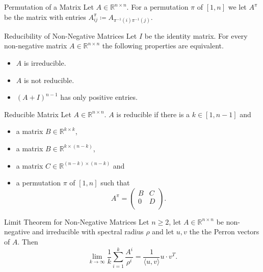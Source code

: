 \documentclass[english]{panikzettel}
\begin{document}
\begin{halfboxl}
\vspace{-\baselineskip}
	\begin{defi}{Permutation of a Matrix}
	Let $A\in\mathbb{R}^{n\times n}$. For a permutation $\pi$ of $[1,n]$ we let $A^\pi$ be the matrix with entries $A_{ij}^\pi\coloneqq A_{\pi^{-1}(i)\pi^{-1}(j)}$.
	\end{defi}

	\begin{theo}{Reducibility of Non-Negative Matrices}
	Let $I$ be the identity matrix. For every non-negative matrix $A\in\mathbb{R}^{n\times n}$ the following properties are equivalent.
	\begin{itemize}
	\item $A$ is irreducible.
	\item $A$ is not reducible.
	\item $(A+I)^{n-1}$ has only positive entries.
	\end{itemize}
	\end{theo}
\end{halfboxl}
\begin{halfboxr}
\vspace{-\baselineskip}
	\begin{defi}{Reducible Matrix}
	Let $A\in\mathbb{R}^{n\times n}$. $A$ is reducible if there is a $k\in[1,n-1]$ and
	\begin{itemize}
	\item a matrix $B\in\mathbb{R}^{k\times k}$,
	\item a matrix $B\in\mathbb{R}^{k\times (n-k)}$,
	\item a matrix $C\in\mathbb{R}^{(n-k)\times (n-k)}$ and
	\item a permutation $\pi$ of $[1,n]$ such that
	\vspace{-0.5\baselineskip}
	\[
	A^\pi=
	\begin{pmatrix}
	B & C\\
	0 & D\\
	\end{pmatrix}.
	\]
	\end{itemize}
	\end{defi}

	\begin{theo}{Limit Theorem for Non-Negative Matrices}
	Let $n\geq 2$, let $A\in\mathbb{R}^{n\times n}$ be non-negative and irreducible with spectral radius $\rho$ and let $u,v$ the the Perron vectors of $A$. Then
	\[
	\lim_{k\to\infty}\frac{1}{k}\sum_{i=1}^k \frac{A^i}{\rho^i}=\frac{1}{\langle u,v \rangle} u\cdot v^T.
	\]
	\end{theo}
\end{halfboxr}
\end{document}
